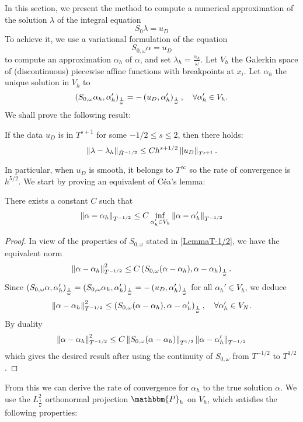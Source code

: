 \documentclass[a4paper]{article}
\begin{document}
In this section, we present the method to compute a numerical approximation of the solution $\lambda$ of the integral equation 
\[S_{0} \lambda = u_D\]
To achieve it, we use a variational formulation of the equation 
\[S_{0,\omega} \alpha = u_D\]
to compute an approximation $\alpha_h$ of $\alpha$, and set $\lambda_h = \frac{\alpha_h}{\omega}$. Let $V_h$ the Galerkin space of (discontinuous) piecewise affine functions with breakpoints at $x_i$. Let $\alpha_h$ the unique solution in $V_h$ to
\[ \left( S_{0,\omega} \alpha_h,\alpha_h'\right)_\frac{1}{\omega} = -\left( u_D,\alpha_h'\right)_\frac{1}{\omega}, \quad \forall \alpha_h' \in V_h.\]
We shall prove the following result:
\begin{The}
	If the data $u_D$ is in $T^{s+1}$ for some $-1/2 \leq s \leq 2$, then there holds:
	\[ \left\|\lambda - \lambda_h\right\|_{\tilde{H}^{-1/2}} \leq C h^{s+1/2} \left\|u_D\right\|_{T^{s+1}}.\]
	\label{theOrdreCVDirichlet}
\end{The}
In particular, when $u_D$ is smooth, it belongs to $T^{\infty}$ so the rate of convergence is $h^{5/2}$.
\noindent We start by proving an equivalent of Céa's lemma: 
\begin{Lem}
	\label{CeaDir}
	There exists a constant $C$ such that 
	\[\left\|\alpha - \alpha_h\right\|_{T^{-1/2}} \leq C \inf_{{\alpha}_h' \in V_h}\left\|\alpha - {\alpha}_h'\right\|_{T^{-1/2}}\]
	\begin{proof}
		In view of the properties of $S_{0,\omega}$ stated in \autoref{LemmaT-1/2}, we have the equivalent norm 
		\[\left\|\alpha - \alpha_h\right\|_{T^{-1/2}}^2 \leq C \left( S_{0,\omega}(\alpha - \alpha_h),\alpha-\alpha_h\right)_\frac{1}{\omega}.\] 
		Since $\left( S_{0,\omega} \alpha,\alpha_h'\right)_\frac{1}{\omega}= \left( S_{0,\omega} \alpha_h,\alpha_h'\right)_\frac{1}{\omega}  = -\left( u_D,\alpha_h'\right)_\frac{1}{\omega} $ for all $\alpha_h' \in V_h$, we deduce 
		\[\left\|\alpha - \alpha_h\right\|_{T^{-1/2}}^2 \leq \left( S_{0,\omega} (\alpha - \alpha_h),\alpha - \alpha'_h\right)_\frac{1}{\omega} , \quad \forall \alpha'_h \in V_N.\]
		By duality
		\[\left\|\alpha - \alpha_h\right\|_{T^{-1/2}}^2 \leq C \left\|S_{0,\omega}(\alpha - \alpha_h)\right\|_{T^{1/2}}\left\|\alpha - \alpha'_h\right\|_{T^{-1/2}}\]
		which gives the desired result after using the continuity of $S_{0,\omega}$ from $T^{-1/2}$ to $T^{1/2}$. 
	\end{proof}
\end{Lem}
From this we can derive the rate of convergence for $\alpha_h$ to the true solution $\alpha$. We use the $L^2_\frac{1}{\omega}$ orthonormal projection $\mathbbm{P}_h$ on $V_h$, which satisfies the following properties:
\end{document}
